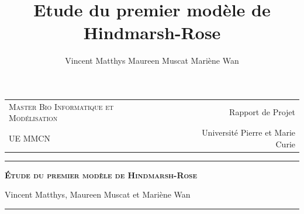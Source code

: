 \documentclass[12pt,a4paper,onecolumn]{article}
\title{Etude du premier modèle de Hindmarsh-Rose}
\author{Vincent Matthys Maureen Muscat Mariène Wan}
\begin{document}
\begin{tabularx}{\textwidth}{@{} l X r @{} }
{\textsc{Master Bio Informatique et Modélisation}} & & Rapport de Projet \\
UE MMCN & &{Université Pierre et Marie Curie}\\
\end{tabularx}
\vspace{1.5cm}
\begin{center}

\rule[11pt]{5cm}{0.5pt}

\textbf{\LARGE \textsc{\'Etude du premier modèle de Hindmarsh-Rose}}
\vspace{0.5cm}

Vincent Matthys, Maureen Muscat et Mariène Wan


\rule{5cm}{0.5pt}

\vspace{1.5cm}



\end{center}
\end{document}

